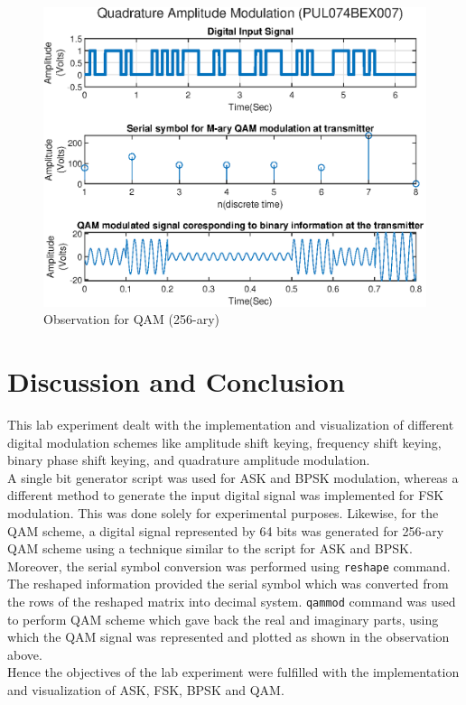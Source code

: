 \documentclass{lab_sheet}
\begin{document}
\begin{figure}[H]
    \centering
    \includegraphics{../Figures/qam-obs}
    \caption{Observation for QAM (256-ary)}
    \label{fig:qam-obs}
\end{figure}

\section{Discussion and Conclusion}
This lab experiment dealt with the implementation and visualization of different digital modulation schemes like amplitude shift keying, frequency shift keying, binary phase shift keying, and quadrature amplitude modulation. \\
A single bit generator script was used for ASK and BPSK modulation, whereas a different method to generate the input digital signal was implemented for FSK modulation. This was done solely for experimental purposes. Likewise, for the QAM scheme, a digital signal represented by 64 bits was generated for 256-ary QAM scheme using a technique similar to the script for ASK and BPSK. Moreover, the serial symbol conversion was performed using \verb|reshape| command. The reshaped information provided the serial symbol which was converted from the rows of the reshaped matrix into decimal system. \verb|qammod| command was used to perform QAM scheme which gave back the real and imaginary parts, using which the QAM signal was represented and plotted as shown in the observation above.\\
Hence the objectives of the lab experiment were fulfilled with the implementation and visualization of ASK, FSK, BPSK and QAM.
\end{document}
